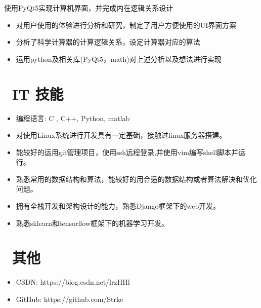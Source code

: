 \documentclass{resume}
\begin{document}
\begin{onehalfspacing}
	使用PyQt5实现计算机界面，并完成内在逻辑关系设计
	\begin{itemize}
		\item 对用户使用的体验进行分析和研究，制定了用户方便使用的UI界面方案
		\item 分析了科学计算器的计算逻辑关系，设定计算器对应的算法
		\item 运用python及相关库(PyQt5，math)对上述分析以及想法进行实现
	\end{itemize}
\end{onehalfspacing}



\section{\faCogs\ IT 技能}
\begin{itemize}[parsep=0.5ex]
  \item 编程语言: C , C++, Python, matlab
  \item 对使用Linux系统进行开发具有一定基础，接触过linux服务器搭建。
  \item 能较好的运用git管理项目，使用ssh远程登录,并使用vim编写shell脚本并运行。
  \item 熟悉常用的数据结构和算法，能较好的用合适的数据结构或者算法解决和优化问题。
  \item 拥有全栈开发和架构设计的能力，熟悉Django框架下的web开发。
  \item 熟悉sklearn和tensorflow框架下的机器学习开发。
  
\end{itemize}



\section{\faInfo\ 其他}
\begin{itemize}[parsep=0.5ex]
  \item CSDN: https://blog.csdn.net/lrzHHl
  \item GitHub: https://github.com/Strke
\end{itemize}

%
%
\end{document}
